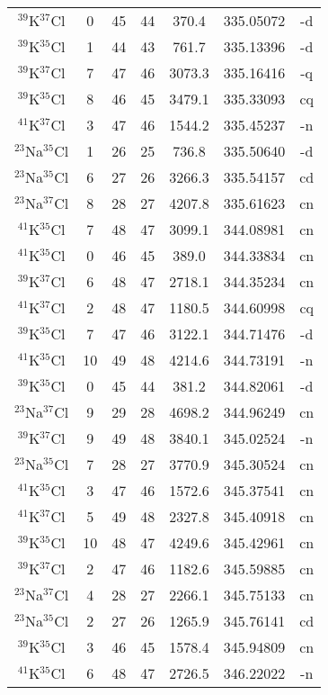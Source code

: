 \begin{table*}[htp]
\begin{tabular}{ccccccc}
$^{39}$K$^{37}$Cl & 0 & 45 & 44 & 370.4 & 335.05072 & -d \\
$^{39}$K$^{35}$Cl & 1 & 44 & 43 & 761.7 & 335.13396 & -d \\
$^{39}$K$^{37}$Cl & 7 & 47 & 46 & 3073.3 & 335.16416 & -q \\
$^{39}$K$^{35}$Cl & 8 & 46 & 45 & 3479.1 & 335.33093 & cq \\
$^{41}$K$^{37}$Cl & 3 & 47 & 46 & 1544.2 & 335.45237 & -n \\
$^{23}$Na$^{35}$Cl & 1 & 26 & 25 & 736.8 & 335.50640 & -d \\
$^{23}$Na$^{35}$Cl & 6 & 27 & 26 & 3266.3 & 335.54157 & cd \\
$^{23}$Na$^{37}$Cl & 8 & 28 & 27 & 4207.8 & 335.61623 & cn \\
$^{41}$K$^{35}$Cl & 7 & 48 & 47 & 3099.1 & 344.08981 & cn \\
$^{41}$K$^{35}$Cl & 0 & 46 & 45 & 389.0 & 344.33834 & cn \\
$^{39}$K$^{37}$Cl & 6 & 48 & 47 & 2718.1 & 344.35234 & cn \\
$^{41}$K$^{37}$Cl & 2 & 48 & 47 & 1180.5 & 344.60998 & cq \\
$^{39}$K$^{35}$Cl & 7 & 47 & 46 & 3122.1 & 344.71476 & -d \\
$^{41}$K$^{35}$Cl & 10 & 49 & 48 & 4214.6 & 344.73191 & -n \\
$^{39}$K$^{35}$Cl & 0 & 45 & 44 & 381.2 & 344.82061 & -d \\
$^{23}$Na$^{37}$Cl & 9 & 29 & 28 & 4698.2 & 344.96249 & cn \\
$^{39}$K$^{37}$Cl & 9 & 49 & 48 & 3840.1 & 345.02524 & -n \\
$^{23}$Na$^{35}$Cl & 7 & 28 & 27 & 3770.9 & 345.30524 & cn \\
$^{41}$K$^{35}$Cl & 3 & 47 & 46 & 1572.6 & 345.37541 & cn \\
$^{41}$K$^{37}$Cl & 5 & 49 & 48 & 2327.8 & 345.40918 & cn \\
$^{39}$K$^{35}$Cl & 10 & 48 & 47 & 4249.6 & 345.42961 & cn \\
$^{39}$K$^{37}$Cl & 2 & 47 & 46 & 1182.6 & 345.59885 & cn \\
$^{23}$Na$^{37}$Cl & 4 & 28 & 27 & 2266.1 & 345.75133 & cn \\
$^{23}$Na$^{35}$Cl & 2 & 27 & 26 & 1265.9 & 345.76141 & cd \\
$^{39}$K$^{35}$Cl & 3 & 46 & 45 & 1578.4 & 345.94809 & cn \\
$^{41}$K$^{35}$Cl & 6 & 48 & 47 & 2726.5 & 346.22022 & -n \\

\end{tabular}
\end{table*}
